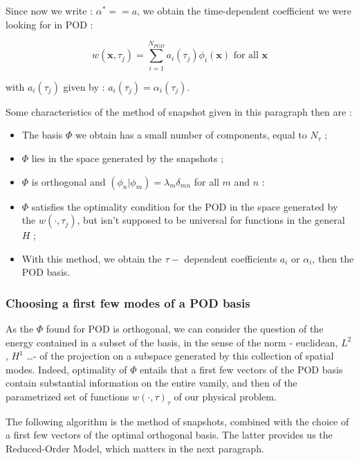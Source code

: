 Since now we write : $\alpha^{\ast}==a$, we obtain the time-dependent coefficient we were looking for in POD :

\[w(\mathbf{x},\tau_j)=\sum\limits_{i=1}^{N_{POD}}a_i(\tau_j)\phi_i(\mathbf{x})\text{ for all $\mathbf{x}$}\]

with $a_i(\tau_j)$ given by : $a_i(\tau_j)=\alpha_i (\tau_j)$.

\ligneinter
Some characteristics of the method of snapshot given in this paragraph then are :

\begin{itemize}
\item The basis $\Phi$ we obtain has a small number of components, equal to $N_{\tau}$ ;
\item $\Phi$ lies in the space generated by the snapshots ;
\item $\Phi$ is orthogonal and $(\phi_n |\phi_m)=\lambda_m\delta_{mn}$ for all $m$ and $n$ :
\item $\Phi$ satisfies the optimality condition for the POD in the space generated by the $w(\cdot , \tau_j)$, but isn't supposed to be universal for functions in the general $H$ ;
\item With this method, we obtain the $\tau-$ dependent coefficients $a_i$ or $\alpha_i$, then the POD basis. 
\end{itemize}

\subsubsection{Choosing a first few modes of a POD basis}

As the $\Phi$ found for POD is orthogonal, we can consider the question of the energy contained in a subset of the basis, %
in the sense of the norm - euclidean, $L^2$, $H^1$ \dots - of the projection on a subspace generated by this collection of spatial modes. %
Indeed, optimality of $\Phi$ entails that a first few vectors of the POD basis contain substantial information on the entire vamily, %
and then of the parametrized set of functions $w(\cdot ,\tau)_{\tau}$ of our physical problem.

\par
The following algorithm is the method of snapshots, combined with the choice of a first few vectors of the optimal orthogonal basis. %
The latter provides us the Reduced-Order Model, which matters in the next paragraph.


